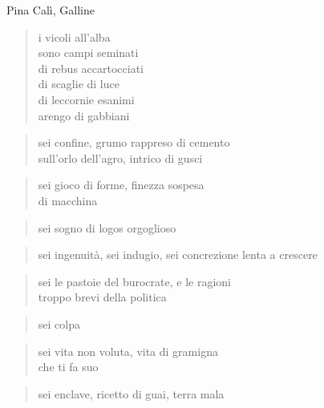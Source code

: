 \clearpage


\begin{artItem}
	Pina Calì, Galline
\end{artItem}

	\begin{verse}
		i vicoli all'alba\\
		sono campi seminati\\
		di rebus accartocciati\\
		di scaglie di luce\\
		di leccornie esanimi\\
		arengo di gabbiani
	\end{verse}

\clearpage


	\begin{verse}
		sei confine, grumo rappreso di cemento\\
		sull'orlo dell'agro, intrico di gusci
	\end{verse}

	\begin{verse}
		sei gioco di forme, finezza sospesa\\
		di macchina
	\end{verse}

	\begin{verse}
		sei sogno di logos orgoglioso
	\end{verse}

	\begin{verse}
		sei ingenuità, sei indugio, sei concrezione
		lenta a crescere
	\end{verse}

	\begin{verse}
		sei le pastoie del burocrate, e le ragioni\\
		troppo brevi della politica
	\end{verse}

	\begin{verse}
		sei colpa
	\end{verse}

	\begin{verse}
		sei vita non voluta, vita di gramigna\\
		che ti fa suo
	\end{verse}

	\begin{verse}
		sei enclave, ricetto di guai, terra mala
	\end{verse}

